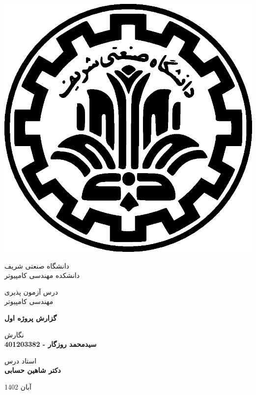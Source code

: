 \begin{center}
	\vspace{5cm}
	
	
	\includegraphics[scale=0.2]{front/pictures/logo.eps}
	
	\vspace{-0.2cm}
	دانشگاه صنعتی شریف \\[-0.3em]
	دانشکده مهندسی کامپیوتر
	
	\begin{large}
		\vspace{0.5cm}
		
		درس آزمون پذیری \\[-0.3em]
		مهندسی کامپیوتر
		
	\end{large}
	
	\vspace{2cm}
	
	{\LARGE\textbf{گزارش پروژه اول}}
	
	\vspace{2cm}
	
	{نگارش}\\[.5em]
	{\large\textbf{سیدمحمد روزگار - 401203382}}
	
	\vspace{0.7cm}
	
	{استاد درس}\\[.5em]
	{\large\textbf{دکتر شاهین حسابی}}
	
	\vspace{1.3cm}
	
	آبان 1402
	
\end{center}

\newpage